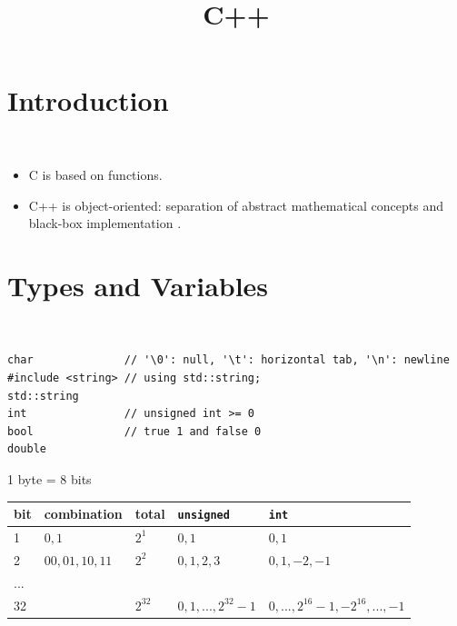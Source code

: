 \documentclass{blog}
\title{C++}
\begin{document}
\maketitle
\tableofcontents
\section{Introduction}
\begin{definition}[C++]~
    \begin{itemize}
        \item C is based on functions.
        \item C++ is object-oriented:
              separation of abstract mathematical concepts and black-box implementation \cite{LIPPMAN_2012_CPP_PRIMER, YAIR_2012_SOLVING_PDES_IN_CPP}.
    \end{itemize}
\end{definition}

\section{Types and Variables}
\begin{definition}~
    \begin{verbatim}
char              // '\0': null, '\t': horizontal tab, '\n': newline
#include <string> // using std::string;
std::string
int               // unsigned int >= 0
bool              // true 1 and false 0
double
\end{verbatim}
\end{definition}

\begin{definition}[bit]
    1 byte = 8 bits
    \begin{center}
        \begin{tabular}{l l l l l}
            \hline
            bit & combination      & total    & \verb|unsigned|       & \verb|int|                           \\
            \hline
            1   & $0, 1$           & $2^{1}$  & $0, 1$                & $0, 1$                               \\
            2   & $00, 01, 10, 11$ & $2^{2}$  & $0, 1, 2, 3$          & $0, 1, -2, -1$                       \\
            ... &                  &          &                       &                                      \\
            32  &                  & $2^{32}$ & $0, 1, ..., 2^{32}-1$ & $0, ..., 2^{16}-1, -2^{16}, ..., -1$ \\
            \hline
        \end{tabular}
    \end{center}
\end{definition}
\end{document}
